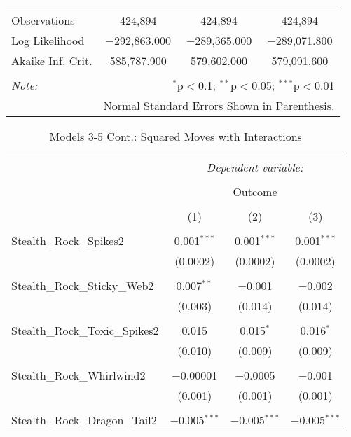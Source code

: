 \documentclass[12pt,twoside]{reedthesis}
\begin{document}
\begin{table}[!htbp]
\begin{tabular}{@{\extracolsep{5pt}}lccc}
  \hline \\[-1.8ex] 
  Observations & 424,894 & 424,894 & 424,894 \\ 
  Log Likelihood & $-$292,863.000 & $-$289,365.000 & $-$289,071.800 \\ 
  Akaike Inf. Crit. & 585,787.900 & 579,602.000 & 579,091.600 \\ 
  \hline 
  \hline \\[-1.8ex] 
  \textit{Note:}  & \multicolumn{3}{r}{$^{*}$p$<$0.1; $^{**}$p$<$0.05; $^{***}$p$<$0.01} \\ 
   & \multicolumn{3}{r}{Normal Standard Errors Shown in Parenthesis.} \\ 
  \end{tabular} 
  \end{table}
  
  \begin{table}[!htbp] \centering 
    \caption{Models 3-5 Cont.: Squared Moves with Interactions} 
    \label{} 
  \begin{tabular}{@{\extracolsep{5pt}}lccc} 
  \\[-1.8ex]\hline 
  \hline \\[-1.8ex] 
   & \multicolumn{3}{c}{\textit{Dependent variable:}} \\ 
  \cline{2-4} 
  \\[-1.8ex] & \multicolumn{3}{c}{Outcome} \\ 
  \\[-1.8ex] & (1) & (2) & (3)\\ 
  \hline \\[-1.8ex] 
   Stealth\_Rock\_Spikes2 & 0.001$^{***}$ & 0.001$^{***}$ & 0.001$^{***}$ \\ 
    & (0.0002) & (0.0002) & (0.0002) \\ 
    & & & \\ 
   Stealth\_Rock\_Sticky\_Web2 & 0.007$^{**}$ & $-$0.001 & $-$0.002 \\ 
    & (0.003) & (0.014) & (0.014) \\ 
    & & & \\ 
   Stealth\_Rock\_Toxic\_Spikes2 & 0.015 & 0.015$^{*}$ & 0.016$^{*}$ \\ 
    & (0.010) & (0.009) & (0.009) \\ 
    & & & \\ 
   Stealth\_Rock\_Whirlwind2 & $-$0.00001 & $-$0.0005 & $-$0.001 \\ 
    & (0.001) & (0.001) & (0.001) \\ 
    & & & \\ 
   Stealth\_Rock\_Dragon\_Tail2 & $-$0.005$^{***}$ & $-$0.005$^{***}$ & $-$0.005$^{***}$ \\ 

\end{tabular}
\end{table}
\end{document}

